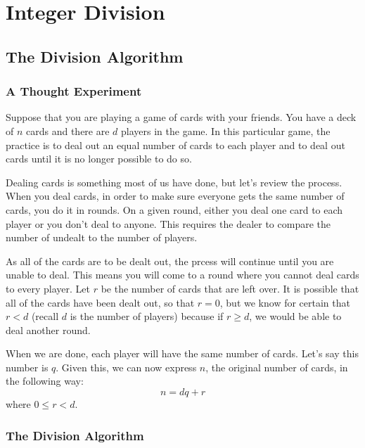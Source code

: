 \chapter{Integer Division}

\section{The Division Algorithm}
\subsection{A Thought Experiment}

Suppose that you are playing a game of cards with your friends.  You have a deck of $n$ cards and there are $d$ players in the game.  In this particular game, the practice is to deal out an equal number of cards to each player and to deal out cards until it is no longer possible to do so.

Dealing cards is something most of us have done, but let's review the process.  When you deal cards, in order to make sure everyone gets the same number of cards, you do it in rounds.  On a given round, either you deal one card to each player or you don't deal to anyone.  This requires the dealer to compare the number of undealt to the number of players.

As all of the cards are to be dealt out, the prcess will continue until you are unable to deal.  This means you will come to a round where you cannot deal cards to every player.  Let $r$ be the number of cards that are left over.  It is possible that all of the cards have been dealt out, so that $r = 0$, but we know for certain that $r < d$ (recall $d$ is the number of players) because if $r \ge d$, we would be able to deal another round.

When we are done, each player will have the same number of cards.  Let's say this number is $q$.  Given this, we can now express $n$, the original number of cards, in the following way:
\[
n = d q + r
\] 
where $0\le r < d$.

\subsection{The Division Algorithm}

